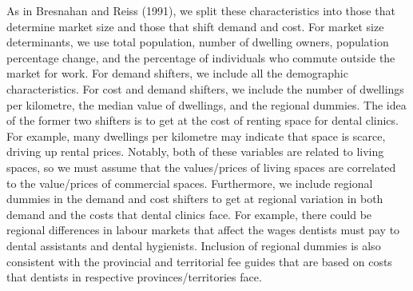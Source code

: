 \documentclass[a4paper,11pt]{article}
\begin{document}
As in Bresnahan and Reiss (1991), we split these characteristics into those that determine market size and those that shift demand and cost. For market size determinants, we use total population, number of dwelling owners, population percentage change, and the percentage of individuals who commute outside the market for work. For demand shifters, we include all the demographic characteristics. For cost and demand shifters, we include the number of dwellings per kilometre, the median value of dwellings, and the regional dummies. The idea of the former two shifters is to get at the cost of renting space for dental clinics. For example, many dwellings per kilometre may indicate that space is scarce, driving up rental prices. Notably, both of these variables are related to living spaces, so we must assume that the values/prices of living spaces are correlated to the value/prices of commercial spaces. Furthermore, we include regional dummies in the demand and cost shifters to get at regional variation in both demand and the costs that dental clinics face. For example, there could be regional differences in labour markets that affect the wages dentists must pay to dental assistants and dental hygienists. Inclusion of regional dummies is also consistent with the provincial and territorial fee guides that are based on costs that dentists in respective provinces/territories face.
\end{document}
